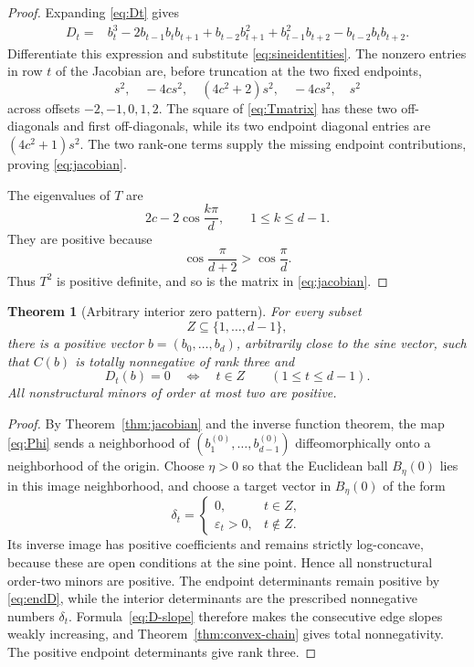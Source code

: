 \documentclass{amsart}
\numberwithin{equation}{section}
\newtheorem{theorem}{Theorem}
\theoremstyle{definition}
\theoremstyle{remark}
\begin{document}
\begin{proof}
Expanding \eqref{eq:Dt} gives
\begin{align}\label{eq:Dpolynomial}
 D_t={}&b_t^3-2b_{t-1}b_tb_{t+1}
      +b_{t-2}b_{t+1}^2+b_{t-1}^2b_{t+2}
      -b_{t-2}b_tb_{t+2}.
\end{align}
Differentiate this expression and substitute \eqref{eq:sineidentities}.  The nonzero entries in row $t$ of the Jacobian are, before truncation at the two fixed endpoints,
\begin{equation}\label{eq:jacentries}
 s^2,
 \quad -4cs^2,
 \quad (4c^2+2)s^2,
 \quad -4cs^2,
 \quad s^2
\end{equation}
across offsets $-2,-1,0,1,2$.  The square of \eqref{eq:Tmatrix} has these two off-diagonals and first off-diagonals, while its two endpoint diagonal entries are $(4c^2+1)s^2$.  The two rank-one terms supply the missing endpoint contributions, proving \eqref{eq:jacobian}.

The eigenvalues of $T$ are
\begin{equation}\label{eq:Teigen}
 2c-2\cos\frac{k\pi}{d},
 \qquad 1\le k\le d-1.
\end{equation}
They are positive because
\[
 \cos\frac{\pi}{d+2}>\cos\frac{\pi}{d}.
\]
Thus $T^2$ is positive definite, and so is the matrix in \eqref{eq:jacobian}.
\end{proof}

\begin{theorem}[Arbitrary interior zero pattern]\label{thm:arbitrary-Z}
For every subset
\[
 Z\subseteq\{1,\ldots,d-1\},
\]
there is a positive vector $b=(b_0,\ldots,b_d)$, arbitrarily close to the sine vector, such that $C(b)$ is totally nonnegative of rank three and
\begin{equation}\label{eq:Zpattern}
 D_t(b)=0
 \quad\Longleftrightarrow\quad
 t\in Z
 \qquad(1\le t\le d-1).
\end{equation}
All nonstructural minors of order at most two are positive.
\end{theorem}

\begin{proof}
By Theorem~\ref{thm:jacobian} and the inverse function theorem, the map \eqref{eq:Phi} sends a neighborhood of $(b_1^{(0)},\ldots,b_{d-1}^{(0)})$ diffeomorphically onto a neighborhood of the origin.  Choose $\eta>0$ so that the Euclidean ball $B_\eta(0)$ lies in this image neighborhood, and choose a target vector in $B_\eta(0)$ of the form
\[
 \delta_t=
 \begin{cases}
 0,&t\in Z,\\
 \varepsilon_t>0,&t\notin Z.
 \end{cases}
\]
Its inverse image has positive coefficients and remains strictly log-concave, because these are open conditions at the sine point.  Hence all nonstructural order-two minors are positive.  The endpoint determinants remain positive by \eqref{eq:endD}, while the interior determinants are the prescribed nonnegative numbers $\delta_t$.  Formula~\eqref{eq:D-slope} therefore makes the consecutive edge slopes weakly increasing, and Theorem~\ref{thm:convex-chain} gives total nonnegativity.  The positive endpoint determinants give rank three.
\end{proof}
\end{document}
